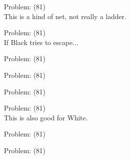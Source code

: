 \documentclass[11pt]{article}
\begin{document}
\begin{minipage}[t]{0.5\textwidth}
  {\centering
  
Problem: (81)\\
This is a kind of net, not really a ladder.\\
  }
\end{minipage}
\begin{minipage}[t]{0.5\textwidth}
  {\centering
  
Problem: (81)\\
If Black tries to escape...\\
  }
\end{minipage}
\begin{minipage}[t]{0.5\textwidth}
  {\centering
  
Problem: (81)\\
  }
\end{minipage}
\begin{minipage}[t]{0.5\textwidth}
  {\centering
  
Problem: (81)\\
  }
\end{minipage}
\begin{minipage}[t]{0.5\textwidth}
  {\centering
  
Problem: (81)\\
  }
\end{minipage}
\begin{minipage}[t]{0.5\textwidth}
  {\centering
  
Problem: (81)\\
This is also good for White.\\
  }
\end{minipage}
\begin{minipage}[t]{0.5\textwidth}
  {\centering
  
Problem: (81)\\
  }
\end{minipage}
\begin{minipage}[t]{0.5\textwidth}
  {\centering
  
Problem: (81)\\
  }
\end{minipage}
\end{document}
